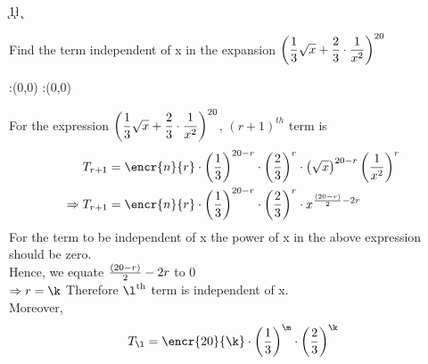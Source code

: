 


\DIVIDE{}\k 
\ADD\k{1}\l
\SUBTRACT\vbthree\k\m

\question Find the term independent of x in the expansion $\left({\dfrac{1}{3} \sqrt{x} + {\dfrac{2}{3}} \cdot \dfrac{1}{x^2}}\right)^{20}$


\watchout

\ifprintanswers
  \begin{marginfigure}
      :(0,0)
      :(0,0)
    \figdrawbegin{}
      \figdrawline [100,101]
    \figdrawend
    \figvisu{\figBoxA}{}{%
    }
    \centerline{\box\figBoxA}
  \end{marginfigure}
\fi 

\begin{solution}
For the expression $\left({\dfrac{1}{3} \sqrt{x} + {\dfrac{2}{3}} \cdot \dfrac{1}{x^2}}\right)^{20}$, $({r+1})^{th}$ term is 
	\begin{align}
	T_{r+1} &= \encr{n}{r} \cdot \left(\vbone\right)^{\vbthree - r}\cdot \left( \vbtwo \right)^{r} \cdot \left({\sqrt{x}}\right)^{\vbthree - r}  \left(\dfrac{1}{x^2}\right)^{r}\\
	\Rightarrow T_{r+1} &= \encr{n}{r} \cdot \left( \vbone \right)^{\vbthree - r}\cdot \left( \vbtwo \right)^{r} \cdot {x}^{\frac{(\vbthree - r)}{2} - 2r} \\
	\end{align}
For the term to be independent of x the power of x in the above expression should be zero.\\
Hence, we equate ${\frac{(20 - r)}{2} - {2r}}$ to $0$\\
$\Rightarrow r = \k \\$
Therefore ${\l}^{\vbfour}$ term is independent of x.\\
Moreover, 
	\begin{align}
	{T}_{\l} = \encr{\vbthree}{\k} \cdot \left( \vbone \right)^{\m}\cdot \left( \vbtwo \right)^{\k}
	 \end{align}

\end{solution}


